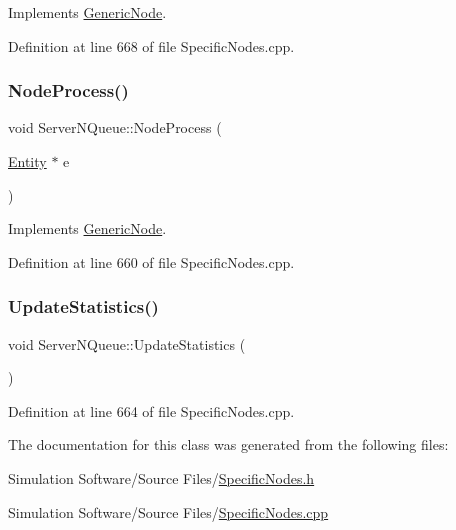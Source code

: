 Implements \hyperlink{class_generic_node_ae7c8424c8c14fd3de993c902d78deb67}{Generic\+Node}.



Definition at line 668 of file Specific\+Nodes.\+cpp.

\mbox{\label{class_server_n_queue_adbc0e634171f6dc0785f2e49659663f7}} 
\subsubsection{\texorpdfstring{Node\+Process()}{NodeProcess()}}
{\footnotesize\ttfamily void Server\+N\+Queue\+::\+Node\+Process (\begin{DoxyParamCaption}\item[{\hyperlink{class_entity}{Entity} $\ast$}]{e }\end{DoxyParamCaption})\hspace{0.3cm}{\ttfamily [virtual]}}



Implements \hyperlink{class_generic_node_ae942258a57f211072d179da470579add}{Generic\+Node}.



Definition at line 660 of file Specific\+Nodes.\+cpp.

\mbox{\label{class_server_n_queue_a08260b431df7adc0495f2e6c1d3ff33f}} 
\subsubsection{\texorpdfstring{Update\+Statistics()}{UpdateStatistics()}}
{\footnotesize\ttfamily void Server\+N\+Queue\+::\+Update\+Statistics (\begin{DoxyParamCaption}{ }\end{DoxyParamCaption})}



Definition at line 664 of file Specific\+Nodes.\+cpp.



The documentation for this class was generated from the following files\+:\begin{DoxyCompactItemize}
\item 
Simulation Software/\+Source Files/\hyperlink{_specific_nodes_8h}{Specific\+Nodes.\+h}\item 
Simulation Software/\+Source Files/\hyperlink{_specific_nodes_8cpp}{Specific\+Nodes.\+cpp}\end{DoxyCompactItemize}
